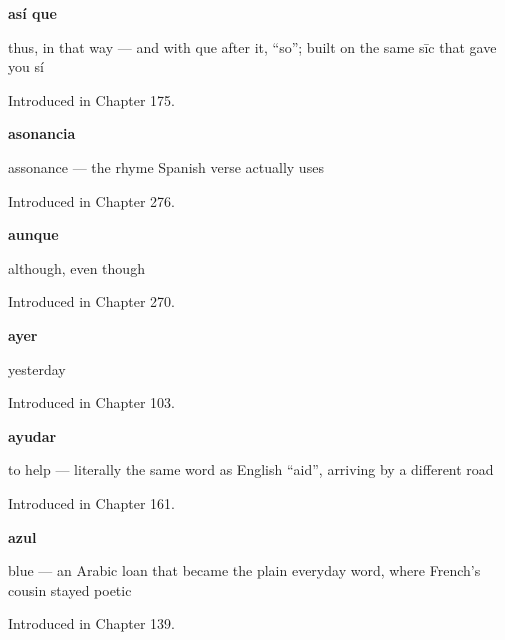 \noindent\begin{minipage}[t]{\linewidth}
\raggedright
\textbf{así que}\par
\small thus, in that way — and with que after it, \textquotedblleft{}so\textquotedblright{}; built on the same sīc that gave you sí\par
\footnotesize Introduced in Chapter 175.
\end{minipage}\par\medskip

\noindent\begin{minipage}[t]{\linewidth}
\raggedright
\textbf{asonancia}\par
\small assonance — the rhyme Spanish verse actually uses\par
\footnotesize Introduced in Chapter 276.
\end{minipage}\par\medskip

\noindent\begin{minipage}[t]{\linewidth}
\raggedright
\textbf{aunque}\par
\small although, even though\par
\footnotesize Introduced in Chapter 270.
\end{minipage}\par\medskip

\noindent\begin{minipage}[t]{\linewidth}
\raggedright
\textbf{ayer}\par
\small yesterday\par
\footnotesize Introduced in Chapter 103.
\end{minipage}\par\medskip

\noindent\begin{minipage}[t]{\linewidth}
\raggedright
\textbf{ayudar}\par
\small to help — literally the same word as English \textquotedblleft{}aid\textquotedblright{}, arriving by a different road\par
\footnotesize Introduced in Chapter 161.
\end{minipage}\par\medskip

\noindent\begin{minipage}[t]{\linewidth}
\raggedright
\textbf{azul}\par
\small blue — an Arabic loan that became the plain everyday word, where French's cousin stayed poetic\par
\footnotesize Introduced in Chapter 139.
\end{minipage}\par\medskip

